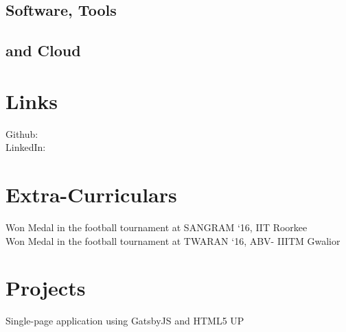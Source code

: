 \documentclass[]{resume}
\begin{document}
\begin{minipage}[t]{0.33\textwidth}
\sectionsep

\subsection{Software, Tools}
\subsection{and Cloud}
\sectionsep

\section{Links} 
Github:  \href{https://github.com/codery2k}{} \\
LinkedIn:  \href{https://www.linkedin.com/in/saurabh-miglani/}{} \\
\sectionsep

\section{Extra-Curriculars} 
Won  Medal in the football tournament at SANGRAM ‘16, IIT Roorkee \\
Won  Medal in the football tournament at TWARAN ‘16, ABV- IIITM Gwalior

\sectionsep



\section{Projects}

Single-page application using GatsbyJS and HTML5 UP 


\end{minipage}
\end{document}
